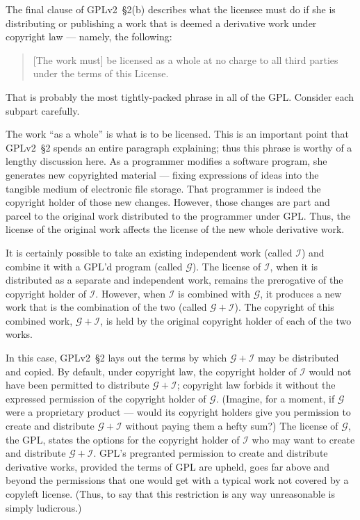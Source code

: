 The final clause of GPLv2~\S2(b) describes what the licensee must do if she is
distributing or publishing a work that is deemed a derivative work under
copyright law --- namely, the following:
\begin{quote}
[The work must] be licensed as a whole at no charge to all third parties
under the terms of this License.
\end{quote}
That is probably the most tightly-packed phrase in all of the GPL\@.
Consider each subpart carefully.

The work ``as a whole'' is what is to be licensed. This is an important
point that GPLv2~\S2 spends an entire paragraph explaining; thus this phrase is
worthy of a lengthy discussion here.  As a programmer modifies a software
program, she generates new copyrighted material --- fixing expressions of
ideas into the tangible medium of electronic file storage.  That
programmer is indeed the copyright holder of those new changes.  However,
those changes are part and parcel to the original work distributed to
the programmer under GPL\@. Thus, the license of the original work
affects the license of the new whole derivative work.

\newcommand{\gplusi}{$\mathcal{G\!\!+\!\!I}$}
\newcommand{\worki}{$\mathcal{I}$}
\newcommand{\workg}{$\mathcal{G}$}

\label{separate-and-independent}

It is certainly possible to take an existing independent work (called
\worki{}) and combine it with a GPL'd program (called \workg{}).  The
license of \worki{}, when it is distributed as a separate and independent
work, remains the prerogative of the copyright holder of \worki{}.
However, when \worki{} is combined with \workg{}, it produces a new work
that is the combination of the two (called \gplusi{}). The copyright of
this combined work, \gplusi{}, is held by the original copyright
holder of each of the two works.

In this case, GPLv2~\S2 lays out the terms by which \gplusi{} may be
distributed and copied.  By default, under copyright law, the copyright
holder of \worki{} would not have been permitted to distribute \gplusi{};
copyright law forbids it without the expressed permission of the copyright
holder of \workg{}. (Imagine, for a moment, if \workg{} were a proprietary
product --- would its copyright holders  give you permission to create and distribute
\gplusi{} without paying them a hefty sum?)  The license of \workg{}, the
GPL, states the  options for the copyright holder of \worki{}
who may want to create and distribute \gplusi{}.  GPL's pregranted
permission to create and distribute derivative works, provided the terms
of GPL are upheld, goes far above and beyond the permissions that one
would get with a typical work not covered by a copyleft license.  (Thus, to
say that this restriction is any way unreasonable is simply ludicrous.)

